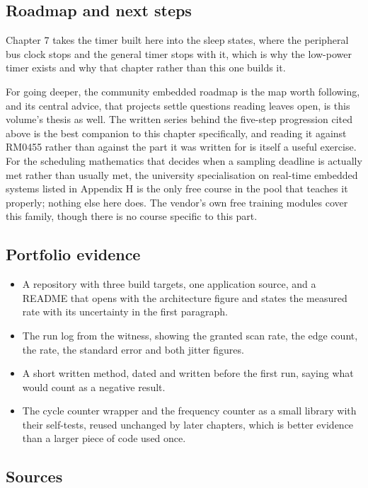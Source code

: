 \subsection*{Roadmap and next steps}

Chapter 7 takes the timer built here into the sleep states, where the
peripheral bus clock stops and the general timer stops with it, which is why the
low-power timer exists and why that chapter rather than this one builds it.

For going deeper, the community embedded roadmap is the map worth following,
and its central advice, that projects settle questions reading leaves open, is
this volume's thesis as well. The written series behind the five-step
progression cited above is the best companion to this chapter specifically, and
reading it against RM0455 rather than against the part it was written for is
itself a useful exercise. For the scheduling mathematics that decides when a
sampling deadline is actually met rather than usually met, the university
specialisation on real-time embedded systems listed in Appendix H is the only
free course in the pool that teaches it properly; nothing else here does. The
vendor's own free training modules cover this family, though there is no course
specific to this part.

\subsection*{Portfolio evidence}

\begin{itemize}
\item A repository with three build targets, one application source, and a
README that opens with the architecture figure and states the measured rate with
its uncertainty in the first paragraph.
\item The run log from the witness, showing the granted scan rate, the edge
count, the rate, the standard error and both jitter figures.
\item A short written method, dated and written before the first run, saying
what would count as a negative result.
\item The cycle counter wrapper and the frequency counter as a small library
with their self-tests, reused unchanged by later chapters, which is better
evidence than a larger piece of code used once.
\end{itemize}

\subsection*{Sources}

